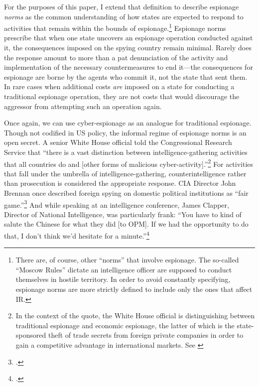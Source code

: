 \documentclass[14pt]{extarticle}
\begin{document}
For the purposes of this paper, I extend that definition to describe espionage \emph{norms} as the common understanding of how states are expected to respond to activities that remain within the bounds of espionage.\footnote{There are, of course, other \enquote{norms} that involve espionage. The so-called \enquote{Moscow Rules} dictate an intelligence officer are supposed to conduct themselves in hostile territory. In order to avoid constantly specifying, espionage norms are more strictly defined to include only the ones that affect IR.} Espionage norms prescribe that when one state uncovers an espionage operation conducted against it, the consequences imposed on the spying country remain minimal. Rarely does the response amount to more than a pat denunciation of the activity and implementation of the necessary countermeasures to end it---the consequences for espionage are borne by the agents who commit it, not the state that sent them. In rare cases when additional costs \emph{are} imposed on a state for conducting a traditional espionage operation, they are not costs that would discourage the aggressor from attempting such an operation again.

Once again, we can use cyber-espionage as an analogue for traditional espionage. Though not codified in US policy, the informal regime of espionage norms is an open secret. A senior White House official told the Congressional Research Service that \enquote{there is a vast distinction between intelligence-gathering activities that all countries do and [other forms of malicious cyber-activity].}\footnote{In the context of the quote, the White House official is distinguishing between traditional espionage and economic espionage, the latter of which is the state-sponsored theft of trade secrets from foreign private companies in order to gain a competitive advantage in international markets. See \cite{finklea_cyber_2015}} For activities that fall under the umbrella of intelligence-gathering, counterintelligence rather than prosecution is considered the appropriate response. CIA Director John Brennan once described foreign spying on domestic political institutions as \enquote{fair game.}\footcite{sanger_u.s._2016} And while speaking at an intelligence conference, James Clapper, Director of National Intelligence, was particularly frank: \enquote{You have to kind of salute the Chinese for what they did [to OPM]. If we had the opportunity to do that, I don’t think we’d hesitate for a minute.}\footcite{pepitone_clapper_2015}
\end{document}
